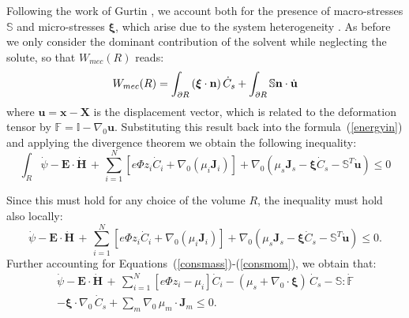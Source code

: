 \documentclass[runningheads]{llncs}
\newcommand{\F}{\ensuremath{\mathbb{F}}}
\begin{document}
Following the work of Gurtin \cite{GURTIN}, we account both for the presence of macro-stresses $\mathbb{S}$ and micro-stresses $\boldsymbol{\xi}$, which arise due to the system heterogeneity \cite{microstress}. As before we only consider the dominant contribution of the solvent while neglecting the solute, so that $W_{mec}(R)$ reads:
\begin{equation}	\centering
%	
W_{mec}(R) = \int_{\partial R} \left(\boldsymbol{\xi}\cdot \mathbf{n}\right)\dot{C}_s + \int_{\partial R} \mathbb{S}\mathbf{n} \cdot \dot{\mathbf{u}}
\end{equation}
where $\mathbf{u}= \mathbf{x}-\mathbf{X}$ is the displacement vector, which is related to the deformation tensor by $\F=\mathbb{I}-\nabla_0 \mathbf{u}$. Substituting this result back into the formula~(\ref{energyin}) and applying the divergence theorem we obtain the following inequality:
\begin{equation}
\int_R \dot{\psi} - \mathbf{E}\cdot \dot{\mathbf{H}} \, + \, \sum\limits_{i=1}^{N} \left[e \Phi  z_i \dot{C}_i+ \nabla_0 \left(\mu_i \mathbf{J}_i \right)\right] + \nabla_0 (\mu_s \mathbf{J}_s- \boldsymbol{\xi}\dot{C}_s -\mathbb{S}^T\mathbf{\dot{u}}) \leq 0 
\end{equation}

Since this must hold for any choice of the volume $R$, the inequality must hold also locally:
\begin{equation}
\dot{\psi} - \mathbf{E}\cdot \dot{\mathbf{H}} \, + \, \sum\limits_{i=1}^{N} \left[e \Phi  z_i \dot{C}_i+ \nabla_0 \left(\mu_i \mathbf{J}_i \right)\right] + \nabla_0 (\mu_s \mathbf{J}_s- \boldsymbol{\xi}\dot{C}_s -\mathbb{S}^T\mathbf{\dot{u}}) \leq 0. 
\end{equation}
Further accounting for Equations~(\ref{consmass})-(\ref{consmom}), we obtain that:
\begin{equation}
\begin{aligned}
\dot{\psi} - \mathbf{E}\cdot \dot{\mathbf{H}} \, + \, \sum\limits_{i=1}^{N} \left[e \Phi  z_i - \mu_i\right] \dot{C}_i - (\mu_s + \nabla_0 \cdot \boldsymbol{\xi})\,\dot{C}_s -\mathbb{S}:\dot{\F}\\
-\boldsymbol{\xi} \cdot \nabla_0 \, \dot{C}_s + \sum\limits_{m} \nabla_0 \, \mu_m \cdot \mathbf{J}_m \leq 0.
\label{temp2}
\end{aligned} 
\end{equation}
\end{document}
